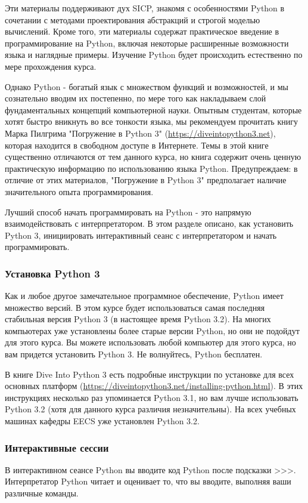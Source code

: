 Эти материалы поддерживают дух SICP, знакомя с особенностями Python в сочетании с методами проектирования абстракций и строгой моделью вычислений. Кроме того, эти материалы содержат практическое введение в программирование на Python, включая некоторые расширенные возможности языка и наглядные примеры. Изучение Python будет происходить естественно по мере прохождения курса.

Однако Python - богатый язык с множеством функций и возможностей, и мы сознательно вводим их постепенно, по мере того как накладываем слой фундаментальных концепций компьютерной науки. Опытным студентам, которые хотят быстро вникнуть во все тонкости языка, мы рекомендуем прочитать книгу Марка Пилгрима "Погружение в Python 3" (\url{https://diveintopython3.net}), которая находится в свободном доступе в Интернете. Темы в этой книге существенно отличаются от тем данного курса, но книга содержит очень ценную практическую информацию по использованию языка Python. Предупреждаем: в отличие от этих материалов, "Погружение в Python 3" предполагает наличие значительного опыта программирования.

Лучший способ начать программировать на Python - это напрямую взаимодействовать с интерпретатором. В этом разделе описано, как установить Python 3, инициировать интерактивный сеанс с интерпретатором и начать программировать.

\subsubsection{Установка Python 3}
Как и любое другое замечательное программное обеспечение, Python имеет множество версий. В этом курсе будет использоваться самая последняя стабильная версия Python 3 (в настоящее время Python 3.2). На многих компьютерах уже установлены более старые версии Python, но они не подойдут для этого курса. Вы можете использовать любой компьютер для этого курса, но вам придется установить Python 3. Не волнуйтесь, Python бесплатен.

В книге Dive Into Python 3 есть подробные инструкции по установке для всех основных платформ (\url{https://diveintopython3.net/installing-python.html}). В этих инструкциях несколько раз упоминается Python 3.1, но вам лучше использовать Python 3.2 (хотя для данного курса различия незначительны). На всех учебных машинах кафедры EECS уже установлен Python 3.2.

\subsubsection{Интерактивные сессии}
В интерактивном сеансе Python вы вводите код Python после подсказки >>>. Интерпретатор Python читает и оценивает то, что вы вводите, выполняя ваши различные команды.

